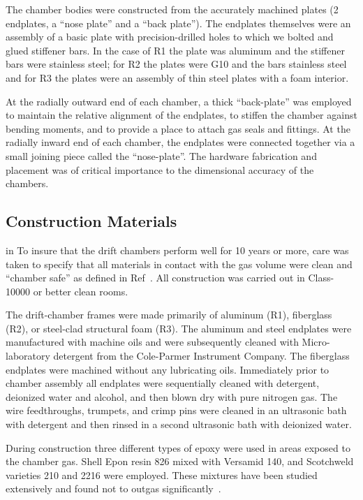 The chamber bodies were constructed from the accurately machined plates
(2 endplates, a ``nose plate'' and a ``back plate'').
The endplates themselves were an assembly of a basic plate with precision-drilled
holes to which we bolted and glued stiffener bars.  In the case of
R1 the plate was aluminum and the stiffener bars were stainless steel;
for R2 the plates were G10 and the bars stainless steel and for R3
the plates were an assembly of thin steel plates with a foam interior.

At the radially outward end of each chamber, a thick ``back-plate'' was 
employed to maintain the relative 
alignment of the endplates, to stiffen the chamber against bending moments, 
and to provide a place to attach gas seals and fittings. At the radially inward 
end of each chamber, the endplates were connected together via a small joining 
piece called the ``nose-plate''.  The hardware fabrication and placement 
was of critical importance to the dimensional accuracy of the chambers.

\subsection{Construction Materials}

 in
To insure that the drift chambers perform well for 10 years or more, care was taken to 
specify that all materials in contact with the gas volume were clean and ``chamber 
safe'' as defined in Ref~\cite{kadyk}.  All construction was carried out in 
Class-10000 or better clean rooms.

The drift-chamber frames were made primarily of aluminum (R1), fiberglass (R2),
or steel-clad structural foam (R3).  The aluminum and steel endplates were 
manufactured with machine oils and were subsequently cleaned with  
Micro-laboratory detergent from the Cole-Parmer Instrument Company.  The 
fiberglass endplates were machined without any lubricating oils.  Immediately 
prior to chamber assembly all endplates were sequentially cleaned with 
detergent,
deionized water and alcohol, and then blown dry with pure nitrogen gas.  The 
wire feedthroughs, trumpets, and crimp pins were cleaned in an ultrasonic bath 
with detergent and then rinsed in a second ultrasonic bath with deionized water.

During construction three different types of epoxy were used in areas exposed 
to the chamber gas.  Shell Epon resin 826 mixed with Versamid 140, and 
Scotchweld varieties 210 and 2216 were employed.  These mixtures have been 
studied extensively and found not to outgas significantly~\cite{nasa}.

